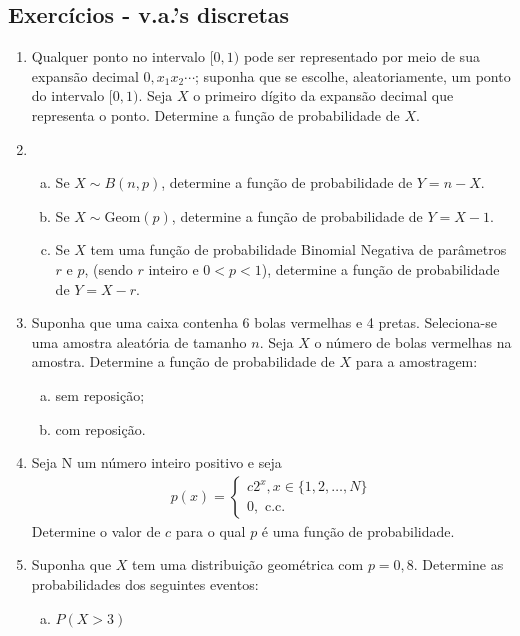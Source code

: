 \documentclass[../Notas.tex]{subfiles}
\begin{document}
\subsection{Exercícios - v.a.'s discretas}

\begin{enumerate}
    \item Qualquer ponto no intervalo $[0, 1)$ pode ser representado por meio de sua expansão decimal $0, x_1x_2\cdots$; suponha que se escolhe, aleatoriamente, um ponto do intervalo $[0, 1)$. Seja $X$ o primeiro dígito da expansão decimal que representa o ponto. Determine a função de probabilidade de $X$.
    \item \begin{enumerate}[a)]
        \item Se $X\sim B(n, p)$, determine a função de probabilidade de $Y = n - X$.
        \item Se $X\sim \text{Geom}(p)$, determine a função de probabilidade de $Y = X - 1$.
        \item Se $X$ tem uma função de probabilidade Binomial Negativa de parâmetros $r$ e $p$, (sendo $r$ inteiro e $0 < p < 1$), determine a função de probabilidade de $Y = X - r$.
    \end{enumerate}
    \item Suponha que uma caixa contenha 6 bolas vermelhas e 4 pretas. Seleciona-se uma amostra aleatória de tamanho $n$. Seja $X$ o número de bolas vermelhas na amostra. Determine a função de probabilidade de $X$ para a amostragem:
    \begin{enumerate}[a)]
    \item sem reposição;
    \item com reposição.
    \end{enumerate}
    \item Seja N um número inteiro positivo e seja
    \begin{align*}
        p(x) = \begin{cases}
        c2^x, x\in\{1, 2, \dots, N\} \\
        0, \text{ c.c.}
        \end{cases}
    \end{align*}
    Determine o valor de $c$ para o qual $p$ é uma função de probabilidade.
    \item Suponha que $X$ tem uma distribuição geométrica com $p = 0,8$. Determine as probabilidades dos seguintes eventos:
    \begin{enumerate}[a)]
    \item $P(X > 3)$

\end{enumerate}
\end{enumerate}
\end{document}
